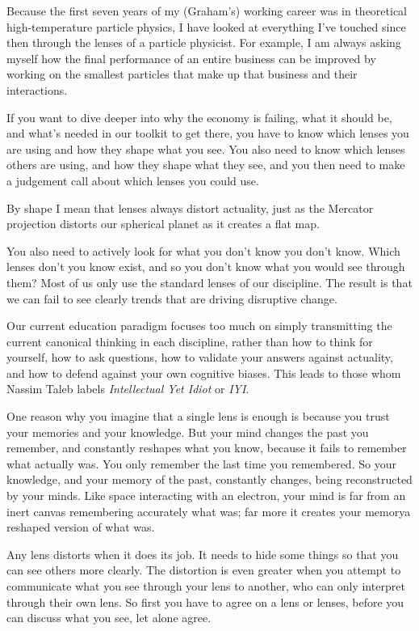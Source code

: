 Because the first seven years of my (Graham’s) working career was in theoretical high-temperature particle physics, I have looked at everything I've touched since then through the lenses of a particle physicist. For example, I am always asking myself how the final performance of an entire business can be improved by working on the smallest particles that make up that business and their interactions. 


If you want to dive deeper into why the economy is failing, what it should be, and what’s needed in our toolkit to get there, you have to know which lenses you are using and how they shape what you see. You also need to know which lenses others are using, and how they shape what they see, and you then need to make a judgement call about which lenses you could use. 


By shape I mean that lenses always distort actuality, just as the Mercator projection distorts our spherical planet as it creates a flat map. 


You also need to actively look for what you don’t know you don't know. Which lenses don’t you know exist, and so you don't know what you would see through them? Most of us only use the standard lenses of our discipline. The result is that we can fail to see clearly trends that are driving disruptive change. 


Our current education paradigm focuses too much on simply transmitting the current canonical thinking in each discipline, rather than how to think for yourself, how to ask questions, how to validate your answers against actuality, and how to defend against your own cognitive biases. This leads to those whom Nassim Taleb\cite{taleb-skin} labels \emph{Intellectual Yet Idiot} or \emph{IYI}. 


One reason why you imagine that a single lens is enough is because you trust your memories and your knowledge. But your mind changes the past you remember, and constantly reshapes what you know, because it fails to remember what actually was\cite{loftus-false-memory-wiki, loftus-false-memory-ted}. You only remember the last time you remembered. So your knowledge, and your memory of the past, constantly changes, being reconstructed by your minds. Like space interacting with an electron, your mind is far from an inert canvas remembering accurately what was; far more it creates your memory\textemdash a reshaped version of what was.


Any lens distorts when it does its job. It needs to hide some things so that you can see others more clearly. The distortion is even greater when you attempt to communicate what you see through your lens to another, who can only interpret through their own lens. So first you have to agree on a lens or lenses, before you can discuss what you see, let alone agree. 


